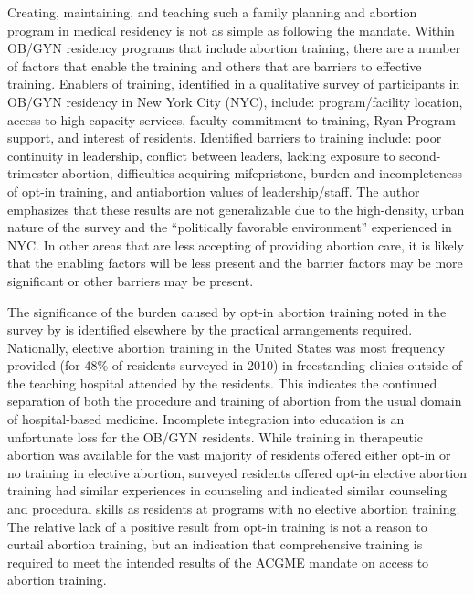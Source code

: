 \documentclass[letterpaper, 12pt]{article}
\begin{document}
Creating, maintaining, and teaching such a family planning and abortion program in medical residency is not as simple as following the mandate. Within OB/GYN residency programs that include abortion training, there are a number of factors that enable the training and others that are barriers to effective training.
Enablers of training, identified in a qualitative survey of participants in OB/GYN residency in New York City (NYC), include: program/facility location, access to high-capacity services, faculty commitment to training, Ryan Program \autocite{bixby_center_for_global_reproductive_health_education_????} \autocite{bixby_center_for_global_reproductive_health_home_????} \autocite{steinauer_benefits_2013} support, and interest of residents. \autocite[pg. 240--2]{guiahi_enablers_2013}
Identified barriers to training include: poor continuity in leadership, conflict between leaders, lacking exposure to second-trimester abortion, difficulties acquiring mifepristone, burden and incompleteness of opt-in training, and antiabortion values of leadership/staff. \autocite[pg. 242]{guiahi_enablers_2013}
The author emphasizes that these results are not generalizable due to the high-density, urban nature of the survey and the ``politically favorable environment'' experienced in NYC. \autocite[pg. 243]{guiahi_enablers_2013}
In other areas that are less accepting of providing abortion care, it is likely that the enabling factors will be less present and the barrier factors may be more significant or other barriers may be present.

The significance of the burden caused by opt-in abortion training noted in the survey by \citeauthor{guiahi_enablers_2013} is identified elsewhere by the practical arrangements required.
Nationally, elective abortion training in the United States was most frequency provided (for 48\% of residents surveyed in 2010) in freestanding clinics outside of the teaching hospital attended by the residents. \autocite[pg. 274]{turk_availability_2014} This indicates the continued separation of both the procedure and training of abortion from the usual domain of hospital-based medicine. Incomplete integration into education is an unfortunate loss for the OB/GYN residents.
While training in therapeutic abortion was available for the vast majority of residents offered either opt-in or no training in elective abortion, surveyed residents offered opt-in elective abortion training had similar experiences in counseling and indicated similar counseling and procedural skills as residents at programs with no elective abortion training. \autocite[pg. 275--6]{turk_availability_2014}
The relative lack of a positive result from opt-in training is not a reason to curtail abortion training, but an indication that comprehensive training is required to meet the intended results of the ACGME mandate on access to abortion training.
\end{document}
